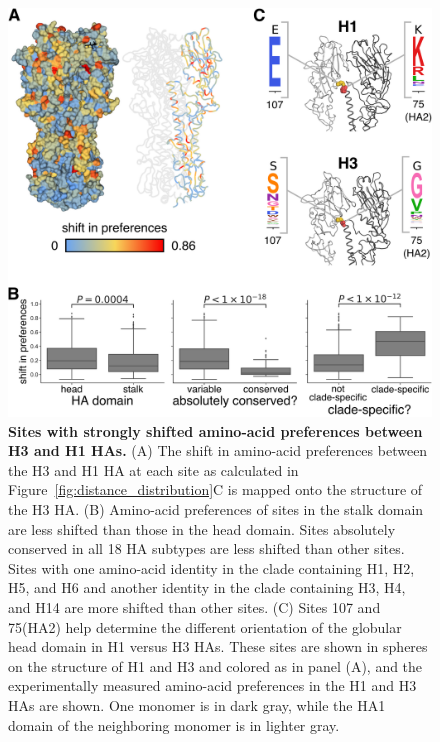 \documentclass[9pt,twocolumn,twoside]{pnas-new}
\begin{document}
\begin{figure}
\centering
\includegraphics[width=\columnwidth]{figs/RMSD_heatmap/RMSD_heatmap.pdf}
\caption{\label{fig:RMSD_heatmap}
{\bf Sites with strongly shifted amino-acid preferences between H3 and H1 HAs.}
(A) The shift in amino-acid preferences between the H3 and H1 HA at each site as calculated in Figure~\ref{fig:distance_distribution}C is mapped onto the structure of the H3 HA. 
(B) Amino-acid preferences of sites in the stalk domain are less shifted than those in the head domain.
Sites absolutely conserved in all 18 HA subtypes are less shifted than other sites.
Sites with one amino-acid identity in the clade containing H1, H2, H5, and H6 and another identity in the clade containing H3, H4, and H14 are more shifted than other sites.
(C) Sites 107 and 75(HA2) help determine the different orientation of the globular head domain in H1 versus H3 HAs.
These sites are shown in spheres on the structure of H1 and H3 and colored as in panel (A), and the experimentally measured amino-acid preferences in the H1 and H3 HAs are shown.
One monomer is in dark gray, while the HA1 domain of the neighboring monomer is in lighter gray.
}
\end{figure}
\end{document}
